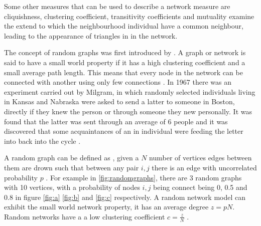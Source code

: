 Some other measures that can be used to describe a network measure are cliquishness, clustering coefficient, transitivity  coefficients and mutuality examine the extend to which the neighbourhood individual have a common neighbour,  leading to the appearance of triangles in  in the network.

 The concept of random graphs was first introduced by \cite{erdodblac1959ldquo}. A graph or network is said to have a small world property if it has a high clustering coefficient and a small average path length. This means that every node in the network can be connected with another using only few connections \citep{estrada2015first}. In 1967 there was an experiment carried out by Milgram, in which randomly selected individuals living in Kansas and Nabraska were asked to send a latter to someone in Boston, directly if they knew the person or through someone they new personally. It was found that the latter was sent through an average of 6 people and it was discovered that some acquaintances of an in individual were feeding the letter into back into the cycle \citep{travers1967small}.

A random graph can be defined as , given a $N$ number of vertices edges between them are drown such that between any pair $i,j$ there is an edge with uncorrelated probability $p$ \citep{newman2002random}. For example in \ref{fig:randomgraphs}, there are 3 random graphs with 10 vertices, with a probability of nodes $i,j$ being connect being 0, 0.5 and 0.8 in figure \ref{fig:a} \ref{fig:b} and \ref{fig:c} respectively. A random network model can exhibit the small world network property, it has an average degree $z= pN$. Random networks have a a low clustering coefficient $ c = \frac{z}{N}$ \citep{newman2003structure}.

